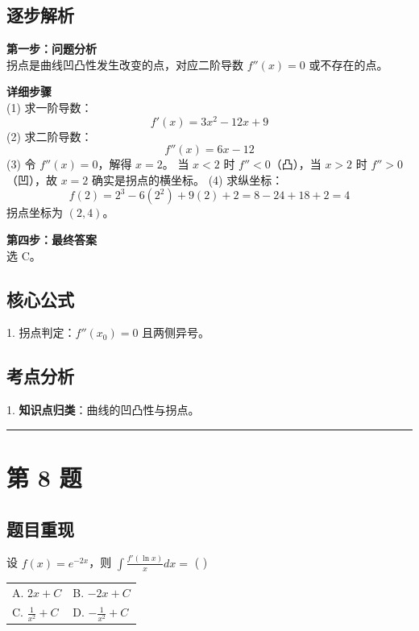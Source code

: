 \documentclass[10pt, a4paper]{ctexart}
\newcommand{\problemheader}{
    \vspace{0.5cm}
    \noindent\rule[0.5ex]{\linewidth}{2pt} %
}
\newcommand{\analysisheader}{
    \vspace{0.2cm}
    \noindent{\color{red}\rule[0.5ex]{\linewidth}{0.5pt}} %
    \vspace{0.1cm}
}
\begin{document}
\analysisheader
{\color{red}
\subsection*{逐步解析}
\textbf{第一步：问题分析} \\
拐点是曲线凹凸性发生改变的点，对应二阶导数 $f''(x) = 0$ 或不存在的点。

\textbf{详细步骤} \\
(1) 求一阶导数：
\[ f'(x) = 3x^2 - 12x + 9 \]
(2) 求二阶导数：
\[ f''(x) = 6x - 12 \]
(3) 令 $f''(x) = 0$，解得 $x = 2$。
当 $x < 2$ 时 $f'' < 0$（凸），当 $x > 2$ 时 $f'' > 0$（凹），故 $x=2$ 确实是拐点的横坐标。
(4) 求纵坐标：
\[ f(2) = 2^3 - 6(2^2) + 9(2) + 2 = 8 - 24 + 18 + 2 = 4 \]
拐点坐标为 $(2, 4)$。

\textbf{第四步：最终答案} \\
选 C。

\subsection*{核心公式}
1. 拐点判定：$f''(x_0)=0$ 且两侧异号。

\subsection*{考点分析}
1. \textbf{知识点归类}：曲线的凹凸性与拐点。
}

\problemheader
\section*{第 8 题}
\subsection*{题目重现}
设 $f(x) = e^{-2x}$，则 $\int \frac{f'(\ln x)}{x} dx =$ ( \quad ) \\
\begin{tabularx}{\linewidth}{@{} *{2}{X} @{}}
    A. $2x + C$ & B. $-2x + C$ \\
    C. $\frac{1}{x^2} + C$ & D. $-\frac{1}{x^2} + C$
\end{tabularx}
\end{document}
